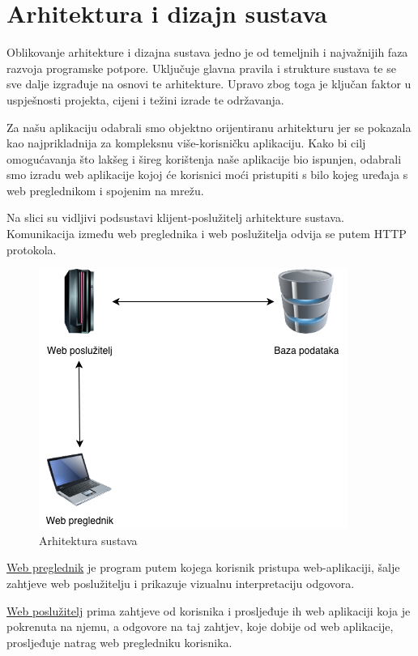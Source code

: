 \chapter{Arhitektura i dizajn sustava}
		
		Oblikovanje arhitekture i dizajna sustava jedno je od temeljnih i najvažnijih faza razvoja programske potpore. Uključuje glavna pravila i strukture sustava te se sve dalje izgrađuje na osnovi te arhitekture. Upravo zbog toga je ključan faktor u uspješnosti projekta, cijeni i težini izrade te održavanja. 
		
		Za našu aplikaciju odabrali smo objektno orijentiranu arhitekturu jer se pokazala kao najprikladnija za kompleksnu više-korisničku aplikaciju. Kako bi cilj omogućavanja što lakšeg i šireg korištenja naše aplikacije bio ispunjen, odabrali smo izradu web aplikacije kojoj će korisnici moći pristupiti s bilo kojeg uređaja s web preglednikom i  spojenim na mrežu.
		
		Na slici su vidljivi podsustavi klijent-poslužitelj arhitekture sustava. Komunikacija između web preglednika i web poslužitelja odvija se putem HTTP protokola.
	
		\begin{figure}[H]
			\centering
			\includegraphics[scale=0.4]{slike/ArhSustav.png}
			\caption{Arhitektura sustava}
		\end{figure}

		\underline{Web preglednik} je program putem kojega korisnik pristupa web-aplikaciji, šalje zahtjeve web poslužitelju i prikazuje vizualnu interpretaciju odgovora.
		
		\underline{Web poslužitelj} prima zahtjeve od korisnika i prosljeđuje ih web aplikaciji koja je pokrenuta na njemu, a odgovore na taj zahtjev, koje dobije od web aplikacije, prosljeđuje natrag web pregledniku korisnika.
		
